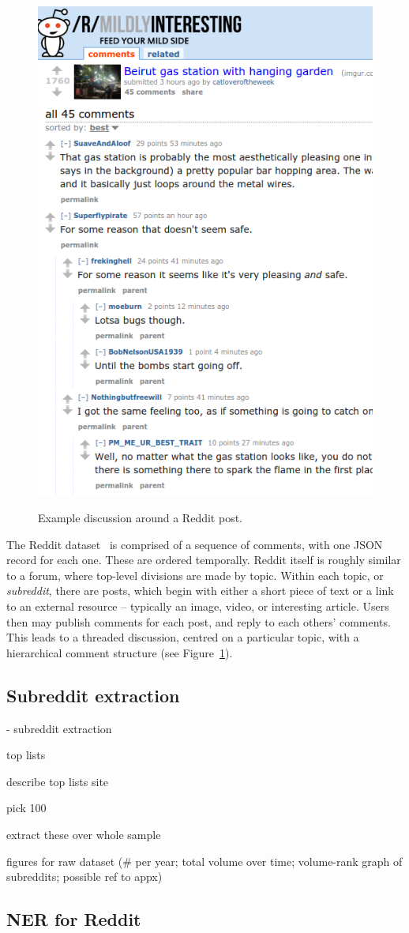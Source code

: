 \documentclass[journal,10pt,draftclsnofoot,onecolumn]{IEEEtran}
\begin{document}
\begin{figure}
\centering
\includegraphics[width=0.4\columnwidth]{reddit-example.png}
\label{fig:reddit-example}
\caption{Example discussion around a Reddit post.}
\end{figure}

The Reddit dataset~\cite{reddit-data} is comprised of a sequence of comments, with one JSON record for each one.
These are ordered temporally.
Reddit itself is roughly similar to a forum, where top-level divisions are made by topic.
Within each topic, or {\em subreddit}, there are posts, which begin with either a short piece of text or a link to an external resource -- typically an image, video, or interesting article.
Users then may publish comments for each post, and reply to each others' comments.
This leads to a threaded discussion, centred on a particular topic, with a hierarchical comment structure (see Figure~\ref{fig:reddit-example}).


\subsection{Subreddit extraction}

- subreddit extraction

top lists

describe top lists site

pick 100

extract these over whole sample

figures for raw dataset (\# per year; total volume over time; volume-rank graph of subreddits; possible ref to appx)

\subsection{NER for Reddit}
\end{document}
